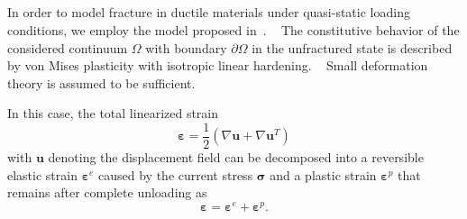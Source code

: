 \documentclass[pdflatex,sn-mathphys-num]{sn-jnl}%
\theoremstyle{thmstyleone}%
\theoremstyle{thmstyletwo}%
\theoremstyle{thmstylethree}%
\begin{document}

\subsection{}\label{sec:phase_fiel_model_ductile}

In order to model fracture in ductile materials under quasi-static loading conditions, we employ the model proposed in~\cite{noll_3d_2020}. 
~\cite{miehe_phasefield_ductile_2016,miehe_phasefield_porous_2016,miehe_phasefield_implementation_2017}
The constitutive behavior of the considered continuum $\Omega$ with boundary $\partial\Omega$ in the unfractured state is described by von Mises plasticity with isotropic linear hardening. 
~\cite{simo_computational_1998}
Small deformation theory is assumed to be sufficient.

In this case, the total linearized strain
\begin{equation}
    \boldsymbol{\varepsilon} = \dfrac{1}{2}\left(\nabla{\boldsymbol{u}} + \nabla{\boldsymbol{u}}^T\right)
\end{equation}
with $\boldsymbol{u}$ denoting the displacement field can be decomposed into a reversible elastic strain $\boldsymbol{\varepsilon}^e$ caused by the current stress $\boldsymbol{\sigma}$ and a plastic strain $\boldsymbol{\varepsilon}^p$ that remains after complete unloading as
\begin{equation}
  \boldsymbol{\varepsilon} =  \boldsymbol{\varepsilon}^e + \boldsymbol{\varepsilon}^p.
\end{equation}
\end{document}
